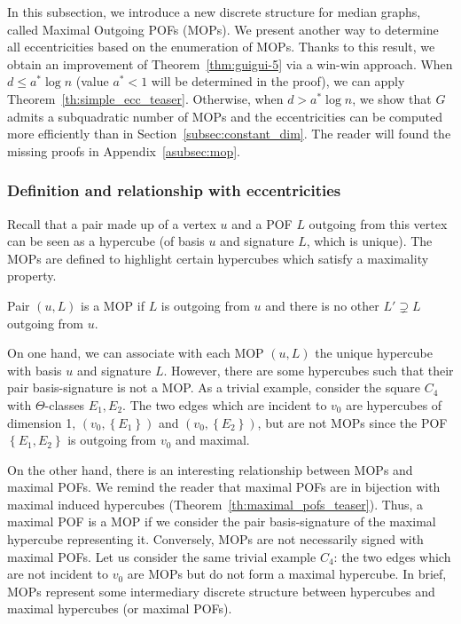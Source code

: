 \documentclass[a4paper,UKenglish,numberwithinsect,cleveref, autoref]{lipics-v2021}
\newcommand{\set}[1]{\left\{ #1 \right\}}
\begin{document}
In this subsection, we introduce a new discrete structure for median graphs, called Maximal Outgoing POFs (MOPs). We present another way to determine all eccentricities based on the enumeration of MOPs. Thanks to this result, we obtain an improvement of Theorem~\ref{thm:guigui-5} via a win-win approach. When $d \le a^*\log n$ (value $a^*<1$ will be determined in the proof), we can apply Theorem~\ref{th:simple_ecc_teaser}. Otherwise, when $d > a^* \log n$, we show that $G$ admits a subquadratic number of MOPs and the eccentricities can be computed more efficiently than in Section~\ref{subsec:constant_dim}. The reader will found the missing proofs in Appendix~\ref{asubsec:mop}.

\subsubsection{Definition and relationship with eccentricities} \label{subsubsec:def_mop}

Recall that a pair made up of a vertex $u$ and a POF $L$ outgoing from this vertex can be seen as a hypercube (of basis $u$ and signature $L$, which is unique). The MOPs are defined to highlight certain hypercubes which satisfy a maximality property.

\begin{definition}
Pair $(u,L)$ is a MOP if $L$ is outgoing from $u$ and there is no other $L' \supsetneq L$ outgoing from $u$.
\label{def:mop}
\end{definition}

On one hand, we can associate with each MOP $(u,L)$ the unique hypercube with basis $u$ and signature $L$. However, there are some hypercubes such that their pair basis-signature is not a MOP. As a trivial example, consider the square $C_4$ with $\Theta$-classes $E_1,E_2$. The two edges which are incident to $v_0$ are hypercubes of dimension 1, $(v_0,\set{E_1})$ and $(v_0,\set{E_2})$, but are not MOPs since the POF $\set{E_1,E_2}$ is outgoing from $v_0$ and maximal.

On the other hand, there is an interesting relationship between MOPs and maximal POFs. We remind the reader that maximal POFs are in bijection with maximal induced hypercubes (Theorem~\ref{th:maximal_pofs_teaser}). Thus, a maximal POF is a MOP if we consider the pair basis-signature of the maximal hypercube representing it. Conversely, MOPs are not necessarily signed with maximal POFs. Let us consider the same trivial example $C_4$: the two edges which are not incident to $v_0$ are MOPs but do not form a maximal hypercube. In brief, MOPs represent some intermediary discrete structure between hypercubes and maximal hypercubes (or maximal POFs).
\end{document}
